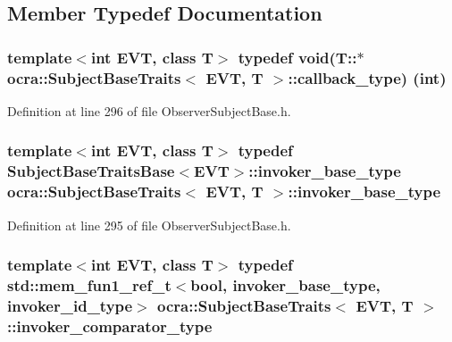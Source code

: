 \subsection{Member Typedef Documentation}
\subsubsection[{\texorpdfstring{callback\+\_\+type}{callback_type}}]{\setlength{\rightskip}{0pt plus 5cm}template$<$int E\+VT, class T$>$ typedef void(T\+::$\ast$ {\bf ocra\+::\+Subject\+Base\+Traits}$<$ E\+VT, T $>$\+::callback\+\_\+type) (int)}\hypertarget{structocra_1_1SubjectBaseTraits_ab8c572ba6805d72ddf4137da6e2f4480}{}\label{structocra_1_1SubjectBaseTraits_ab8c572ba6805d72ddf4137da6e2f4480}


Definition at line 296 of file Observer\+Subject\+Base.\+h.

\subsubsection[{\texorpdfstring{invoker\+\_\+base\+\_\+type}{invoker_base_type}}]{\setlength{\rightskip}{0pt plus 5cm}template$<$int E\+VT, class T$>$ typedef {\bf Subject\+Base\+Traits\+Base}$<$E\+VT$>$\+::{\bf invoker\+\_\+base\+\_\+type} {\bf ocra\+::\+Subject\+Base\+Traits}$<$ E\+VT, T $>$\+::{\bf invoker\+\_\+base\+\_\+type}}\hypertarget{structocra_1_1SubjectBaseTraits_a067ad14df588b765cd8941e21348c954}{}\label{structocra_1_1SubjectBaseTraits_a067ad14df588b765cd8941e21348c954}


Definition at line 295 of file Observer\+Subject\+Base.\+h.

\subsubsection[{\texorpdfstring{invoker\+\_\+comparator\+\_\+type}{invoker_comparator_type}}]{\setlength{\rightskip}{0pt plus 5cm}template$<$int E\+VT, class T$>$ typedef std\+::mem\+\_\+fun1\+\_\+ref\+\_\+t$<$bool, {\bf invoker\+\_\+base\+\_\+type}, {\bf invoker\+\_\+id\+\_\+type}$>$ {\bf ocra\+::\+Subject\+Base\+Traits}$<$ E\+VT, T $>$\+::{\bf invoker\+\_\+comparator\+\_\+type}}\hypertarget{structocra_1_1SubjectBaseTraits_a791cf85201dfcbdc6213946c36d698ca}{}\label{structocra_1_1SubjectBaseTraits_a791cf85201dfcbdc6213946c36d698ca}


